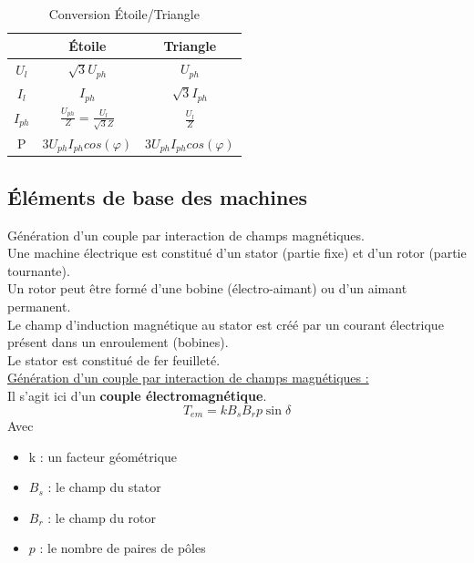\documentclass[../main.tex]{subfiles}
\begin{document}
\begin{table}[hbt!]
    \centering
    \begin{tabular}{|c|c|c|}
    \hline
    \multicolumn{1}{|c|}{\diagbox[width=7mm,height=5mm]{\diagbox[width=7mm,height=5mm,dir=SW]{}{}}{}} & Étoile & Triangle \\
    \hline
    $U_l$ & $\sqrt{3}U_{ph} $ & $U_{ph}$\\
    \hline
    $I_l$ & $I_{ph}$ & $\sqrt{3} I_{ph}$\\
    \hline
    $I_{ph}$ & $\frac{U_{ph}}{Z} = \frac{U_l}{\sqrt{3}Z}$ & $\frac{U_{l}}{Z}$ \\
    \hline
    P & $3 U_{ph} I_{ph} cos(\varphi)$ & $3 U_{ph} I_{ph}cos(\varphi)$\\
    \hline

    \end{tabular}
    \caption{Conversion Étoile/Triangle}
    
\end{table}

\subsection{Éléments de base des machines}
Génération d'un couple par interaction de champs magnétiques.\\
Une machine électrique est constitué d'un stator (partie fixe) et d'un rotor (partie tournante).\\
Un rotor peut être formé d'une bobine (électro-aimant) ou d'un aimant permanent.\\
Le champ d'induction magnétique au stator est créé par un courant électrique présent dans un enroulement (bobines).\\

Le stator est constitué de fer feuilleté.\\

\quad \underline{Génération d'un couple par interaction de champs magnétiques :}\\
Il s'agit ici d'un \textbf{couple électromagnétique}.\\

\begin{equation}
    T_{em} = k B_s B_r p \sin{\delta}
\end{equation}
Avec \begin{itemize}
    \item k : un facteur géométrique\\
    \item $B_s$ : le champ du stator\\
    \item $B_r$ : le champ du rotor\\
    \item $p$ : le nombre de paires de pôles\\
\end{itemize}
\end{document}

